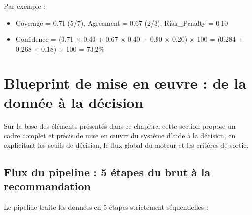 \documentclass{rapportENSIAS} %
\begin{document}
\noindent
Par exemple :
\begin{itemize}
    \item Coverage = 0.71 (5/7), Agreement = 0.67 (2/3), Risk\_Penalty = 0.10
    \item Confidence = (0.71 × 0.40 + 0.67 × 0.40 + 0.90 × 0.20) × 100 = (0.284 + 0.268 + 0.18) × 100 = 73.2\%
\end{itemize}

\section{Blueprint de mise en \oe uvre : de la donnée à la décision}
\label{sec:blueprint}

\noindent
Sur la base des éléments présentés dans ce chapitre, cette section propose un cadre complet et précis de mise en \oe uvre du système d'aide à la décision, en explicitant les seuils de décision, le flux global du moteur et les critères de sortie.

\subsection{Flux du pipeline : 5 étapes du brut à la recommandation}

\noindent
Le pipeline traite les données en 5 étapes strictement séquentielles :
\end{document}
